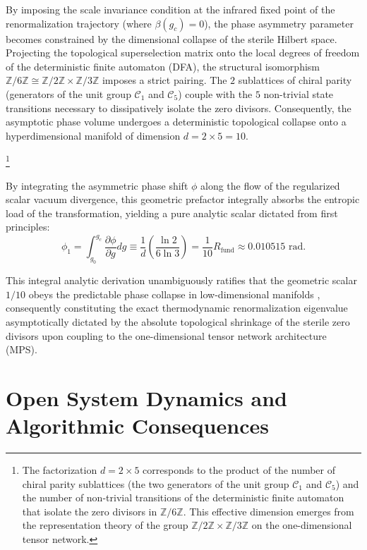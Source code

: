 \documentclass[reprint,aps,pra,superscriptaddress,nofootinbib]{revtex4-2}
\theoremstyle{plain}
\theoremstyle{definition}
\theoremstyle{remark}
\begin{document}
By imposing the scale invariance condition at the infrared fixed point of the renormalization trajectory (where $\beta(g_c) = 0$), the phase asymmetry parameter becomes constrained by the dimensional collapse of the sterile Hilbert space. Projecting the topological superselection matrix onto the local degrees of freedom of the deterministic finite automaton (DFA), the structural isomorphism $\mathbb{Z}/6\mathbb{Z} \cong \mathbb{Z}/2\mathbb{Z} \times \mathbb{Z}/3\mathbb{Z}$ imposes a strict pairing. The $2$ sublattices of chiral parity (generators of the unit group $\mathcal{C}_1$ and $\mathcal{C}_5$) couple with the $5$ non-trivial state transitions necessary to dissipatively isolate the zero divisors. Consequently, the asymptotic phase volume undergoes a deterministic topological collapse onto a hyperdimensional manifold of dimension $d = 2 \times 5 = 10$.

\footnote{The factorization $d = 2 \times 5$ corresponds to the product of the number of chiral parity sublattices (the two generators of the unit group $\mathcal{C}_1$ and $\mathcal{C}_5$) and the number of non-trivial transitions of the deterministic finite automaton that isolate the zero divisors in $\mathbb{Z}/6\mathbb{Z}$. This effective dimension emerges from the representation theory of the group $\mathbb{Z}/2\mathbb{Z} \times \mathbb{Z}/3\mathbb{Z}$ on the one-dimensional tensor network.}

By integrating the asymmetric phase shift $\phi$ along the flow of the regularized scalar vacuum divergence, this geometric prefactor integrally absorbs the entropic load of the transformation, yielding a pure analytic scalar dictated from first principles:
\begin{equation}
\phi_1 = \int_{g_0}^{g_c} \frac{\partial \phi}{\partial g} dg \equiv \frac{1}{d} \left( \frac{\ln 2}{6\ln 3} \right) = \frac{1}{10} R_{\text{fund}} \approx 0.010515 \text{ rad}.
\label{eq:phi1_exact_derivation}
\end{equation}

This integral analytic derivation unambiguously ratifies that the geometric scalar $1/10$ obeys the predictable phase collapse in low-dimensional manifolds \cite{Peinador_Emergencia_Geometria_2025}, consequently constituting the exact thermodynamic renormalization eigenvalue asymptotically dictated by the absolute topological shrinkage of the sterile zero divisors upon coupling to the one-dimensional tensor network architecture (MPS).

\section{Open System Dynamics and Algorithmic Consequences}
\label{sec:consecuencias}
\end{document}
